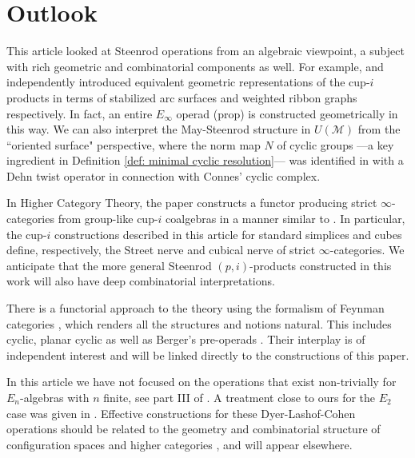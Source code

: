 
\section{Outlook} \label{s:outlook}

This article looked at Steenrod operations from an algebraic viewpoint, a subject with rich geometric and combinatorial components as well.
For example, \cite{Postnikov} and \cite{medina2018prop2} independently introduced equivalent geometric representations of the cup-$i$ products in terms of stabilized arc surfaces \cite{KLP} and weighted ribbon graphs respectively.
In fact, an entire $E_\infty$ operad (prop) is constructed geometrically in this way.
We can also interpret the May-Steenrod structure in $U(\mathcal M)$ from the ``oriented surface" perspective, where the norm map $N$ of cyclic groups ---a key ingredient in Definition \ref{def: minimal cyclic resolution}--- was identified in \cite{KLP} with a Dehn twist operator in connection with Connes' cyclic complex.

In Higher Category Theory, the paper \cite{medina2020globular} constructs a functor producing strict \mbox{$\infty$-cat}egories from group-like cup-$i$ coalgebras in a manner similar to \cite{steiner2004omega}.
In particular, the cup-$i$ constructions described in this article for standard simplices and cubes define, respectively, the Street nerve and cubical nerve of strict $\infty$-categories.
We anticipate that the more general Steenrod $(p,i)$-products constructed in this work will also have deep combinatorial interpretations.

There is a functorial approach to the theory using the formalism of Feynman categories \cite{feynman},
which renders all the structures and notions natural.
This includes cyclic, planar cyclic as well as Berger's pre-operads \cite{BergerRecog}.
Their interplay is of independent interest \cite{BergerKaufmann,feyrep} and will be linked directly to the constructions of this paper.

In this article we have not focused on the operations that exist non-trivially for \mbox{$E_n$-algebras} with $n$ finite, see part III of \cite{may76homology}.
A treatment close to ours for the $E_2$ case was given in \cite{Tourtchine}.
Effective constructions for these Dyer-Lashof-Cohen operations should be related to the geometry and combinatorial structure of configuration spaces \cite{KZhang,sinha2013littledisks,berger04combinatorial,ayala2014configuration} and higher categories \cite{Bathigher, BalFiedSchwVogt, Rezkhigher}, and will appear elsewhere.

